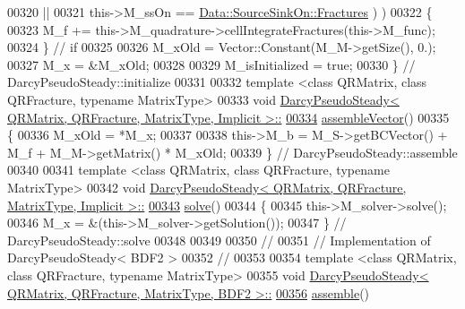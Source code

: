 \begin{DoxyCode}
00320                 ||
00321               this->M\_ssOn == \hyperlink{classFVCode3D_1_1Data_a4d66e2e205b350cb240820540339e1a3aaa3a14735ecc914d217c516ad93fb640}{Data::SourceSinkOn::Fractures} ) )
00322     \{
00323         M\_f += this->M\_quadrature->cellIntegrateFractures(this->M\_func);
00324     \} \textcolor{comment}{// if}
00325 
00326     M\_xOld = Vector::Constant(M\_M->getSize(), 0.);
00327     M\_x = &M\_xOld;
00328 
00329     M\_isInitialized = \textcolor{keyword}{true};
00330 \} \textcolor{comment}{// DarcyPseudoSteady::initialize}
00331 
00332 \textcolor{keyword}{template} <\textcolor{keyword}{class} QRMatrix, \textcolor{keyword}{class} QRFracture, \textcolor{keyword}{typename} MatrixType>
00333 \textcolor{keywordtype}{void} \hyperlink{classFVCode3D_1_1DarcyPseudoSteady}{DarcyPseudoSteady< QRMatrix, QRFracture, MatrixType, Implicit >::}
\hypertarget{DarcyPseudoSteady_8hpp_source.tex_l00334}{}\hyperlink{classFVCode3D_1_1DarcyPseudoSteady_3_01QRMatrix_00_01QRFracture_00_01MatrixType_00_01Implicit_01_4_abbd82a04eb7c2905f8207a80ed21532d}{00334} \hyperlink{classFVCode3D_1_1DarcyPseudoSteady}{assembleVector}()
00335 \{
00336     M\_xOld = *M\_x;
00337 
00338     this->M\_b = M\_S->getBCVector() + M\_f + M\_M->getMatrix() * M\_xOld;
00339 \} \textcolor{comment}{// DarcyPseudoSteady::assemble}
00340 
00341 \textcolor{keyword}{template} <\textcolor{keyword}{class} QRMatrix, \textcolor{keyword}{class} QRFracture, \textcolor{keyword}{typename} MatrixType>
00342 \textcolor{keywordtype}{void} \hyperlink{classFVCode3D_1_1DarcyPseudoSteady}{DarcyPseudoSteady< QRMatrix, QRFracture, MatrixType, Implicit >::}
\hypertarget{DarcyPseudoSteady_8hpp_source.tex_l00343}{}\hyperlink{classFVCode3D_1_1DarcyPseudoSteady_3_01QRMatrix_00_01QRFracture_00_01MatrixType_00_01Implicit_01_4_a60bcb1a13f01071aac73f9e5e590f049}{00343} \hyperlink{classFVCode3D_1_1DarcyPseudoSteady}{solve}()
00344 \{
00345     this->M\_solver->solve();
00346     M\_x = &(this->M\_solver->getSolution());
00347 \} \textcolor{comment}{// DarcyPseudoSteady::solve}
00348 
00349 
00350 \textcolor{comment}{//}
00351 \textcolor{comment}{// Implementation of DarcyPseudoSteady< BDF2 >}
00352 \textcolor{comment}{//}
00353 
00354 \textcolor{keyword}{template} <\textcolor{keyword}{class} QRMatrix, \textcolor{keyword}{class} QRFracture, \textcolor{keyword}{typename} MatrixType>
00355 \textcolor{keywordtype}{void} \hyperlink{classFVCode3D_1_1DarcyPseudoSteady}{DarcyPseudoSteady< QRMatrix, QRFracture, MatrixType, BDF2 >::}
\hypertarget{DarcyPseudoSteady_8hpp_source.tex_l00356}{}\hyperlink{classFVCode3D_1_1DarcyPseudoSteady_3_01QRMatrix_00_01QRFracture_00_01MatrixType_00_01BDF2_01_4_a5026cafc64baea6f01592fdb440ff60d}{00356} \hyperlink{classFVCode3D_1_1DarcyPseudoSteady}{assemble}()

\end{DoxyCode}
